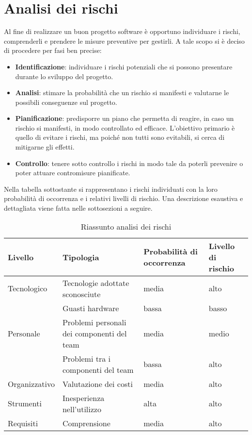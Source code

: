 \section{Analisi dei rischi}
	Al fine di realizzare un buon progetto software è opportuno individuare i rischi, comprenderli e prendere le misure preventive per gestirli. A tale scopo si è deciso di procedere per fasi ben precise:
	\begin{itemize}
		\item \textbf{Identificazione}: individuare i rischi potenziali che si possono presentare durante lo sviluppo del progetto.
		\item \textbf{Analisi}: stimare la probabilità che un rischio si manifesti e valutarne le possibili conseguenze sul progetto.
		\item \textbf{Pianificazione}: predisporre un piano che permetta di reagire, in caso un rischio si manifesti, in modo controllato ed efficace. L'obiettivo primario è quello di evitare i rischi, ma poiché non tutti sono evitabili, si cerca di mitigarne gli effetti.
		\item \textbf{Controllo}: tenere sotto controllo i rischi in modo tale da poterli prevenire o poter attuare contromisure pianificate.
	\end{itemize}
	Nella tabella sottostante si rappresentano i rischi individuati con la loro probabilità di occorrenza e i relativi livelli di rischio.
	Una descrizione esaustiva e dettagliata viene fatta nelle sottosezioni a seguire.
	\begin{table}[H]\centering \tabulinesep=3pt
			\begin{tabu}to \textwidth {|X[4]|X[3c]|X[4]|X[4]|}
				\hline
				Livello 			& Tipologia					& Probabilità di occorrenza 		& Livello di rischio  \\ \hline

				Tecnologico			& Tecnologie adottate sconosciute				& media 					& alto 		 \\ 
				  					& Guasti hardware								& bassa 					& basso 	 \\ \hline
				Personale		 	& Problemi personali dei componenti del team	& media 					& medio 	 \\ 
									& Problemi tra i componenti del team			& bassa 					& alto 		 \\ \hline
				Organizzativo	 	& Valutazione dei costi							& media 					& alto 		 \\ \hline
				Strumenti			& Inesperienza nell'utilizzo					& alta 						& alto 		 \\ \hline
				Requisiti		 	& Comprensione 									& media						& alto 		 \\ \hline
			\end{tabu}
		\caption{Riassunto analisi dei rischi}
	\end{table}

